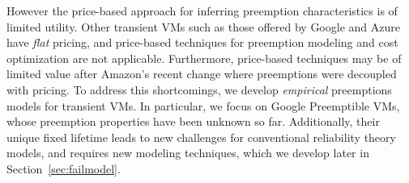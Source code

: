 

However the price-based approach for inferring preemption characteristics is of limited utility.
Other transient VMs such as those offered by Google and Azure have \emph{flat} pricing, and price-based techniques for preemption modeling and cost optimization are not applicable.
Furthermore, price-based techniques may be of limited value after Amazon's recent change where preemptions were decoupled with pricing.
To address this shortcomings, we develop \emph{empirical} preemptions models for transient VMs.
In particular, we focus on Google Preemptible VMs, whose preemption properties have been unknown so far.
Additionally, their unique fixed lifetime leads to new challenges for conventional reliability theory models, and requires new modeling techniques, which we develop later in Section~\ref{sec:failmodel}. 







